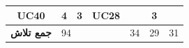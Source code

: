 \documentclass[12pt]{article}
\begin{document}
\begin{longtable}{|c|ccc|l|l|l|}
		UC40                 & \multicolumn{1}{c|}{4}               & \multicolumn{1}{c|}{3}                                                                         & UC28               &                                                                                            & \multicolumn{1}{c|}{3}                                                                        &                                                                                            \\ \hline
		\textbf{جمع تلاش}    & \multicolumn{3}{l|}{94}                                                                                                                                    & 34                                                                                         & 29                                                                                            & 31                                                                                         \\ \hline
	\end{longtable}
\end{document}
